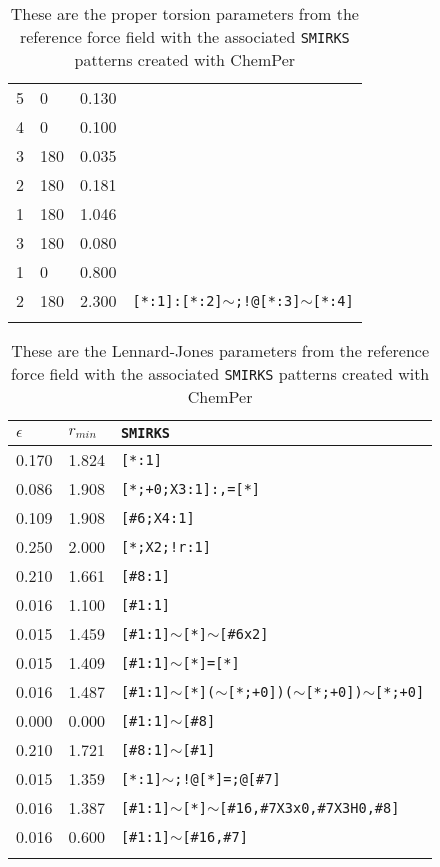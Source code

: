 \begin{longtable}{>{\baselineskip=10pt}p{} >{\baselineskip=10pt}p{} >{\baselineskip=10pt}p{} >{\baselineskip=10pt}p{}}
5 & 0 & 0.130 & \\ 
4 & 0 & 0.100 & \\ 
3 & 180 & 0.035 & \\ 
2 & 180 & 0.181 & \\ 
1 & 180 & 1.046 & \\ 
3 & 180 & 0.080 & \multirow{2}{*}{\texttt{[*:1]=[*:2]$\sim$[*:3]($\sim$[\#1])($\sim$[\#6H1])$\sim$[*:4]}} \\ 
1 & 0 & 0.800 & \\ 
2 & 180 & 2.300 & \texttt{[*:1]:[*:2]$\sim$;!@[*:3]$\sim$[*:4]} \\ 
\caption{These are the proper torsion parameters from the reference force field with the associated \texttt{SMIRKS} patterns created with ChemPer} 
\label{tab:protein_proper}
\end{longtable}


\begin{longtable}{>{\baselineskip=10pt}p{} >{\baselineskip=10pt}p{} >{\baselineskip=10pt}p{}} 
\hline 
\textbf{$\epsilon$} & \textbf{$r_{min}$} & \textbf{\texttt{SMIRKS}} \\ 
\hline 
\endhead0.170 & 1.824 & \texttt{[*:1]} \\ 
0.086 & 1.908 & \texttt{[*;+0;X3:1]:,=[*]} \\ 
0.109 & 1.908 & \texttt{[\#6;X4:1]} \\ 
0.250 & 2.000 & \texttt{[*;X2;!r:1]} \\ 
0.210 & 1.661 & \texttt{[\#8:1]} \\ 
0.016 & 1.100 & \texttt{[\#1:1]} \\ 
0.015 & 1.459 & \texttt{[\#1:1]$\sim$[*]$\sim$[\#6x2]} \\ 
0.015 & 1.409 & \texttt{[\#1:1]$\sim$[*]=[*]} \\ 
0.016 & 1.487 & \texttt{[\#1:1]$\sim$[*]($\sim$[*;+0])($\sim$[*;+0])$\sim$[*;+0]} \\ 
0.000 & 0.000 & \texttt{[\#1:1]$\sim$[\#8]} \\ 
0.210 & 1.721 & \texttt{[\#8:1]$\sim$[\#1]} \\ 
0.015 & 1.359 & \texttt{[*:1]$\sim$;!@[*]=;@[\#7]} \\ 
0.016 & 1.387 & \texttt{[\#1:1]$\sim$[*]$\sim$[\#16,\#7X3x0,\#7X3H0,\#8]} \\ 
0.016 & 0.600 & \texttt{[\#1:1]$\sim$[\#16,\#7]} \\ 
\caption{These are the Lennard-Jones parameters from the reference force field with the associated \texttt{SMIRKS} patterns created with ChemPer} 
\label{tab:protein_lj}
\end{longtable}


